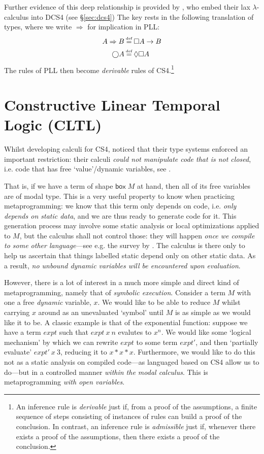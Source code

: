 \documentclass[a4paper]{amsart}
\newcommand{\ibox}[1]{\mathsf{box\;}#1}
\newcommand{\myeq}{\stackrel{\mathclap{\tiny\mbox{def}}}{=}}
\begin{document}
Further evidence of this deep relationship is provided by
\cite{Davies2001}, who embed their lax $\lambda$-calculus into
\textsf{DCS4} (see \S \ref{sec:dcs4}) The key rests in the
following translation of types, where we write $\Rightarrow$ for
implication in \textsf{PLL}: \begin{align*}
  A \Rightarrow B &\myeq \Box A \rightarrow B \\
  \bigcirc A &\myeq \lozenge \Box A
\end{align*} The rules of \textsf{PLL} then become \emph{derivable}
rules of \textsf{CS4}.\footnote{An inference rule is
\emph{derivable} just if, from a proof of the assumptions, a
finite sequence of steps consisting of instances of rules can build a
proof of the conclusion. In contrast, an inference rule is
\emph{admissible} just if, whenever there exists a proof of the
assumptions, then there exists a proof of the conclusion.}

\section{Constructive Linear Temporal Logic (\textsf{CLTL})}
  \label{sec:cltl}

Whilst developing calculi for \textsf{CS4}, \cite{Davies1996,
Davies1999, Davies2001a} noticed that their type systems enforced
an important restriction: their calculi \emph{could not manipulate
code that is not closed}, i.e. code that has free `value'/dynamic
variables, see \cite[\S 8]{Davies2001a}.

That is, if we have a term of shape $\ibox{M}$ at hand, then all
of its free variables are of modal type. This is a very useful
property to know when practicing metaprogramming: we know that
this term only depends on code, i.e. \emph{only depends on static
data}, and we are thus ready to generate code for it. This
generation process may involve some static analysis or local
optimizations applied to $M$, but the calculus shall not control
those: they will happen \emph{once we compile to some other
language}---see e.g. the survey by \cite{Wickline1998}. The
calculus is there only to help us ascertain that things labelled
static depend only on other static data. As a result, \emph{no
unbound dynamic variables will be encountered upon evaluation}.

However, there is a lot of interest in a much more simple and
direct kind of metaprogramming, namely that of \emph{symbolic
execution}. Consider a term $M$ with one a free \emph{dynamic}
variable, $x$. We would like to be able to reduce $M$ whilst
carrying $x$ around as an unevaluated `symbol' until $M$ is
as simple as we would like it to be. A classic example is that of
the exponential function: suppose we have a term $expt$ such that
$expt\ x\ n$ evalutes to $x^n$. We would like some `logical
mechanism' by which we can rewrite $expt$ to some term $expt'$,
and then `partially evaluate' $expt'\ x\ 3$, reducing it to $x * x
* x$. Furthermore, we would like to do this not as a static
analysis on compiled code---as languaged based on \textsf{CS4}
allow us to do---but in a controlled manner \emph{within the modal
calculus}. This is metaprogramming \emph{with open variables}.
\end{document}
